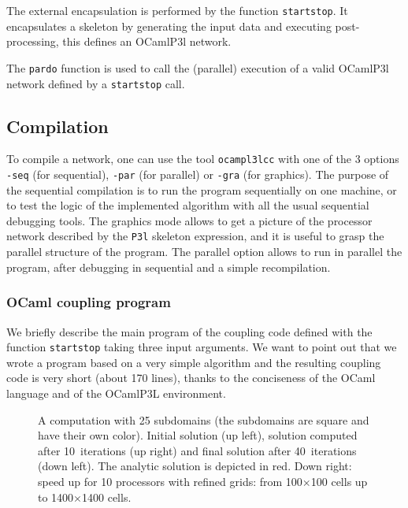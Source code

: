 The external encapsulation is performed by the function {\tt startstop}.
It encapsulates a skeleton by generating the input data and executing
post-processing, this defines an OCamlP3l network.

The {\tt pardo} function is used to call the (parallel) execution of a valid
OCamlP3l network defined by a {\tt startstop} call.

\subsection{Compilation}

To compile a network, one can use the tool {\tt ocampl3lcc} with one
of the 3 options {\tt -seq} (for sequential), {\tt -par} (for
parallel) or {\tt -gra} (for graphics). The purpose of the sequential
compilation is to run the program sequentially on one machine, or to
test the logic of the implemented algorithm with all the usual
sequential debugging tools. The graphics mode allows to get a picture
of the processor network described by the {\tt P3l} skeleton expression,
and it is useful to grasp the parallel structure of the program. The
parallel option allows to run in parallel the program, after debugging
in sequential and a simple recompilation.

\subsubsection*{OCaml coupling program}

We briefly describe the main program of the coupling code defined with the
function {\tt startstop} taking three input arguments. We want to point out
that we wrote a program based on a very simple algorithm and the resulting
coupling code is very short (about 170 lines), thanks to the conciseness of
the OCaml language and of the OCamlP3L environment.

\begin{figure}[htb]
  \begin{center} 
\end{center}
    \caption{A computation with 25 subdomains (the subdomains are
    square and have their own color). Initial solution (up left),
    solution computed after 10~iterations (up right) and final
    solution after 40~iterations (down left). The analytic solution is
    depicted in red.  Down right: speed up for 10 processors with
    refined grids: from 100$\times$100 cells up to 1400$\times$1400
    cells.}  \label{f:conv}
\end{figure}

